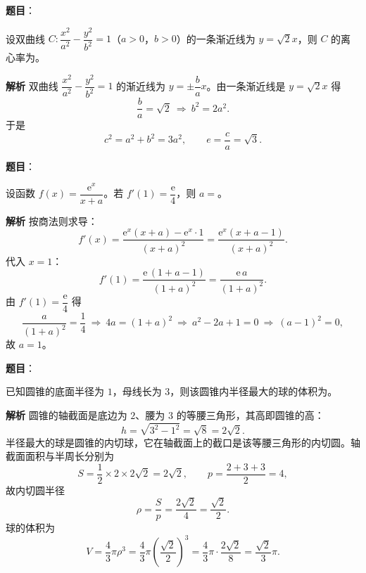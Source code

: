 \begin{answer}

\textbf{题目}：

设双曲线 $C:\dfrac{x^2}{a^2}-\dfrac{y^2}{b^2}=1$（$a>0$，$b>0$）的一条渐近线为 $y=\sqrt2x$，则 $C$ 的离心率为\gkblank{}。

\textbf{解析}
双曲线 $\dfrac{x^2}{a^2}-\dfrac{y^2}{b^2}=1$ 的渐近线为 $y=\pm\dfrac bax$。由一条渐近线是 $y=\sqrt2x$ 得
\nopagebreak[4]
\[\frac ba=\sqrt2\ \Longrightarrow\ b^2=2a^2 .\]
于是
\nopagebreak[4]
\[c^2=a^2+b^2=3a^2,\qquad e=\frac ca=\sqrt3 .\]


\end{answer}
\begin{answer}

\textbf{题目}：

设函数 $f(x)=\dfrac{\mathrm e^x}{x+a}$。若 $f'(1)=\dfrac{\mathrm e}4$，则 $a=$\gkblank{}。

\textbf{解析}
按商法则求导：
\nopagebreak[4]
\[f'(x)=\frac{\mathrm e^x(x+a)-\mathrm e^x\cdot1}{(x+a)^2}=\frac{\mathrm e^x(x+a-1)}{(x+a)^2} .\]
代入 $x=1$：
\nopagebreak[4]
\[f'(1)=\frac{\mathrm e\,(1+a-1)}{(1+a)^2}=\frac{\mathrm e\,a}{(1+a)^2} .\]
由 $f'(1)=\dfrac{\mathrm e}4$ 得
\nopagebreak[4]
\[\frac a{(1+a)^2}=\frac14\ \Longrightarrow\ 4a=(1+a)^2\ \Longrightarrow\ a^2-2a+1=0\ \Longrightarrow\ (a-1)^2=0,\]
故 $a=1$。


\end{answer}
\begin{answer}

\textbf{题目}：

已知圆锥的底面半径为 $1$，母线长为 $3$，则该圆锥内半径最大的球的体积为\gkblank{}。

\textbf{解析}
圆锥的轴截面是底边为 $2$、腰为 $3$ 的等腰三角形，其高即圆锥的高：
\nopagebreak[4]
\[h=\sqrt{3^2-1^2}=\sqrt8=2\sqrt2 .\]
半径最大的球是圆锥的内切球，它在轴截面上的截口是该等腰三角形的内切圆。轴截面面积与半周长分别为
\nopagebreak[4]
\[S=\frac12\times2\times2\sqrt2=2\sqrt2,\qquad p=\frac{2+3+3}2=4,\]
故内切圆半径
\nopagebreak[4]
\[\rho=\frac Sp=\frac{2\sqrt2}4=\frac{\sqrt2}2 .\]
球的体积为
\nopagebreak[4]
\[V=\frac43\pi\rho^3=\frac43\pi\left(\frac{\sqrt2}2\right)^3=\frac43\pi\cdot\frac{2\sqrt2}8=\frac{\sqrt2}3\pi .\]


\end{answer}
